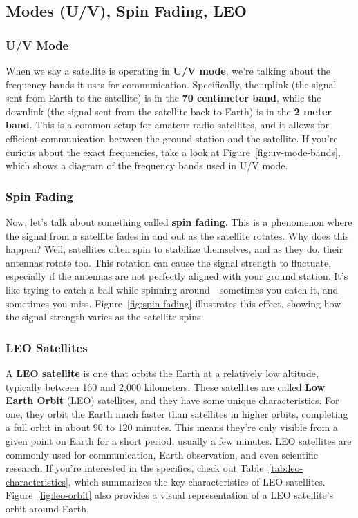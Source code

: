 \subsection{Modes (U/V), Spin Fading, LEO}
\label{subsec:sat-modes}

\subsubsection*{U/V Mode}
When we say a satellite is operating in \textbf{U/V mode}, we're talking about the frequency bands it uses for communication. Specifically, the uplink (the signal sent from Earth to the satellite) is in the \textbf{70 centimeter band}, while the downlink (the signal sent from the satellite back to Earth) is in the \textbf{2 meter band}. This is a common setup for amateur radio satellites, and it allows for efficient communication between the ground station and the satellite. If you're curious about the exact frequencies, take a look at Figure~\ref{fig:uv-mode-bands}, which shows a diagram of the frequency bands used in U/V mode.

\subsubsection*{Spin Fading}
Now, let's talk about something called \textbf{spin fading}. This is a phenomenon where the signal from a satellite fades in and out as the satellite rotates. Why does this happen? Well, satellites often spin to stabilize themselves, and as they do, their antennas rotate too. This rotation can cause the signal strength to fluctuate, especially if the antennas are not perfectly aligned with your ground station. It's like trying to catch a ball while spinning around—sometimes you catch it, and sometimes you miss. Figure~\ref{fig:spin-fading} illustrates this effect, showing how the signal strength varies as the satellite spins.

\subsubsection*{LEO Satellites}
A \textbf{LEO satellite} is one that orbits the Earth at a relatively low altitude, typically between 160 and 2,000 kilometers. These satellites are called \textbf{Low Earth Orbit} (LEO) satellites, and they have some unique characteristics. For one, they orbit the Earth much faster than satellites in higher orbits, completing a full orbit in about 90 to 120 minutes. This means they're only visible from a given point on Earth for a short period, usually a few minutes. LEO satellites are commonly used for communication, Earth observation, and even scientific research. If you're interested in the specifics, check out Table~\ref{tab:leo-characteristics}, which summarizes the key characteristics of LEO satellites. Figure~\ref{fig:leo-orbit} also provides a visual representation of a LEO satellite's orbit around Earth.

